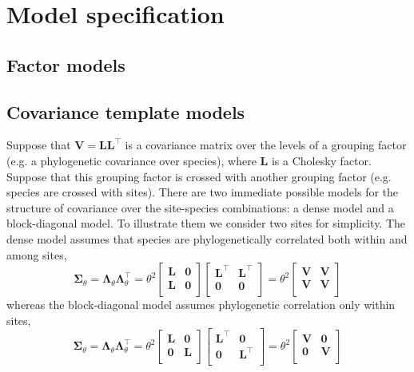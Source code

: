 \documentclass[12pt]{article}\usepackage[]{graphicx}\usepackage[]{color}
\begin{document}
\section{Model specification}

\subsection{Factor models}

\subsection{Covariance template models}

Suppose that $\bm V = \bm L\bm L^\top$ is a covariance matrix over the
levels of a grouping factor (e.g. a phylogenetic covariance over
species), where $\bm L$ is a Cholesky factor.  Suppose that this
grouping factor is crossed with another grouping factor (e.g. species
are crossed with sites).  There are two immediate possible models for
the structure of covariance over the site-species combinations: a
dense model and a block-diagonal model.  To illustrate them we
consider two sites for simplicity.  The dense model assumes that
species are phylogenetically correlated both within and among sites,
\begin{equation}
  \label{eq:2}
  \bm\Sigma_\theta = \bm\Lambda_\theta\bm\Lambda_\theta^\top =
  \theta^2\begin{bmatrix}
    \bm L & \bm 0 \\
    \bm L & \bm 0 \\
  \end{bmatrix}
  \begin{bmatrix}
    \bm L^\top & \bm L^\top \\
    \bm 0      & \bm 0      \\
  \end{bmatrix} = 
  \theta^2\begin{bmatrix}
    \bm V & \bm V \\
    \bm V & \bm V \\
  \end{bmatrix}
\end{equation}
whereas the block-diagonal model assumes phylogenetic correlation only
within sites,
\begin{equation}
  \label{eq:2}
  \bm\Sigma_\theta = \bm\Lambda_\theta\bm\Lambda_\theta^\top =
  \theta^2\begin{bmatrix}
    \bm L & \bm 0 \\
    \bm 0 & \bm L \\
  \end{bmatrix}
  \begin{bmatrix}
    \bm L^\top & \bm 0      \\
    \bm 0      & \bm L^\top \\
  \end{bmatrix} = 
  \theta^2\begin{bmatrix}
    \bm V & \bm 0 \\
    \bm 0 & \bm V \\
  \end{bmatrix}
\end{equation}
\end{document}
